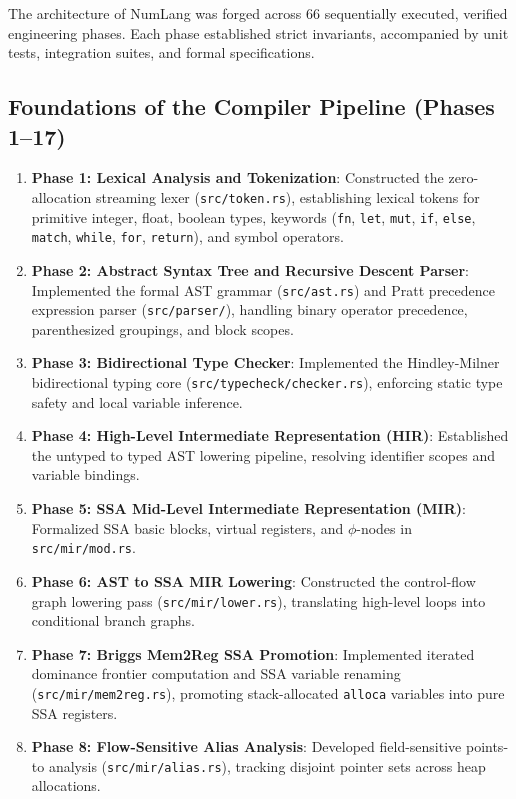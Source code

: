 The architecture of NumLang was forged across 66 sequentially executed, verified engineering phases. Each phase established strict invariants, accompanied by unit tests, integration suites, and formal specifications.

\subsection{Foundations of the Compiler Pipeline (Phases 1--17)}
\begin{enumerate}
    \item \textbf{Phase 1: Lexical Analysis and Tokenization}: Constructed the zero-allocation streaming lexer (\texttt{src/token.rs}), establishing lexical tokens for primitive integer, float, boolean types, keywords (\texttt{fn}, \texttt{let}, \texttt{mut}, \texttt{if}, \texttt{else}, \texttt{match}, \texttt{while}, \texttt{for}, \texttt{return}), and symbol operators.
    \item \textbf{Phase 2: Abstract Syntax Tree and Recursive Descent Parser}: Implemented the formal AST grammar (\texttt{src/ast.rs}) and Pratt precedence expression parser (\texttt{src/parser/}), handling binary operator precedence, parenthesized groupings, and block scopes.
    \item \textbf{Phase 3: Bidirectional Type Checker}: Implemented the Hindley-Milner bidirectional typing core (\texttt{src/typecheck/checker.rs}), enforcing static type safety and local variable inference.
    \item \textbf{Phase 4: High-Level Intermediate Representation (HIR)}: Established the untyped to typed AST lowering pipeline, resolving identifier scopes and variable bindings.
    \item \textbf{Phase 5: SSA Mid-Level Intermediate Representation (MIR)}: Formalized SSA basic blocks, virtual registers, and $\phi$-nodes in \texttt{src/mir/mod.rs}.
    \item \textbf{Phase 6: AST to SSA MIR Lowering}: Constructed the control-flow graph lowering pass (\texttt{src/mir/lower.rs}), translating high-level loops into conditional branch graphs.
    \item \textbf{Phase 7: Briggs Mem2Reg SSA Promotion}: Implemented iterated dominance frontier computation and SSA variable renaming (\texttt{src/mir/mem2reg.rs}), promoting stack-allocated \texttt{alloca} variables into pure SSA registers.
    \item \textbf{Phase 8: Flow-Sensitive Alias Analysis}: Developed field-sensitive points-to analysis (\texttt{src/mir/alias.rs}), tracking disjoint pointer sets across heap allocations.

\end{enumerate}
